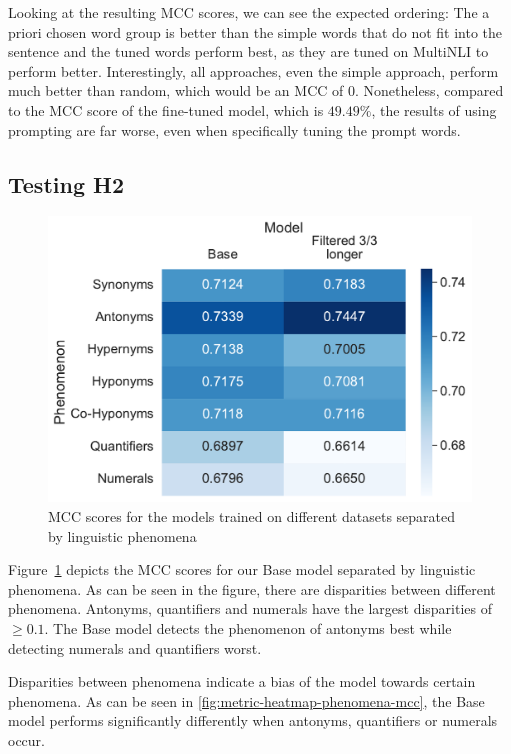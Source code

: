 Looking at the resulting \ac{MCC} scores, we can see the expected ordering: The a priori chosen word group is better than the simple words that do not fit into the sentence and the tuned words perform best, as they are tuned on \ac{MultiNLI} to perform better. Interestingly, all approaches, even the simple approach, perform much better than random, which would be an \ac{MCC} of $0$. Nonetheless, compared to the \ac{MCC} score of the fine-tuned model, which is $49.49\%$, the results of using prompting are far worse, even when specifically tuning the prompt words.

\subsection{Testing H2}
\begin{figure}[ht]
    \centering
    \includegraphics[width=0.9\columnwidth]{./images/metric_heatmaps_phenomena/all_words/matthews_correlation.pdf}
    \caption{\ac{MCC} scores for the models trained on different datasets separated by linguistic phenomena}
    \label{fig:metric-heatmap-phenomena-mcc}
\end{figure}

Figure~\ref{fig:metric-heatmap-phenomena-mcc} depicts the \acs{MCC} scores for our Base model separated by linguistic phenomena. As can be seen in the figure, there are disparities between different phenomena. Antonyms, quantifiers and numerals have the largest disparities of $\geq 0.1$. The Base model detects the phenomenon of antonyms best while detecting numerals and quantifiers worst.

Disparities between phenomena indicate a bias of the model towards certain phenomena. As can be seen in \autoref{fig:metric-heatmap-phenomena-mcc}, the Base model performs significantly differently when antonyms, quantifiers or numerals occur.

